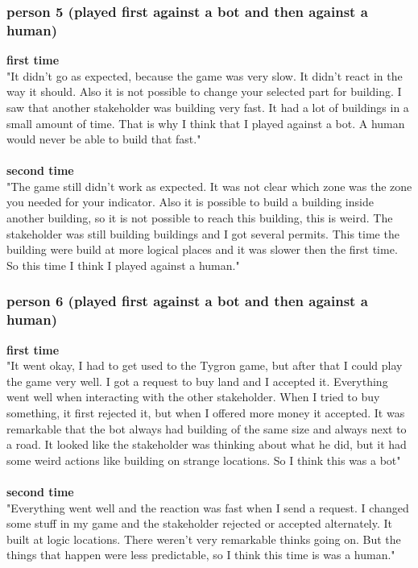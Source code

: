 \subsubsection{person 5 (played first against a bot and then against a human)}
\textbf{first time}\\
"It didn't go as expected, because the game was very slow. It didn't react in the way it should. Also it is not possible to change your selected part for building. I saw that another stakeholder was building very fast. It had a lot of buildings in a small amount of time. That is why I think that I played against a bot. A human would never be able to build that fast." 
\\ \\
\textbf{second time} \\ 
"The game still didn't work as expected. It was not clear which zone was the zone you needed for your indicator. Also it is possible to build a building inside another building, so it is not possible to reach this building, this is weird. The stakeholder was still building buildings and I got several permits. This time the building were build at more logical places and it was slower then the first time. So this time I think I played against a human."

\subsubsection{person 6 (played first against a bot and then against a human)}
\textbf{first time}\\
"It went okay, I had to get used to the Tygron game, but after that I could play the game very well. I got a request to buy land and I accepted it. Everything went well when interacting with the other stakeholder. When I tried to buy something, it first rejected it, but when I offered more money it accepted. It was remarkable that the bot always had building of the same size and always next to a road. It looked like the stakeholder was thinking about what he did, but it had some weird actions like building on strange locations. So I think this was a bot"
 \\ \\
\textbf{second time}\\
"Everything went well and the reaction was fast when I send a request. I changed some stuff in my game and the stakeholder rejected or accepted alternately. It built at logic locations. There weren't very remarkable thinks going on. But the things that happen were less predictable, so I think this time is was a human."
